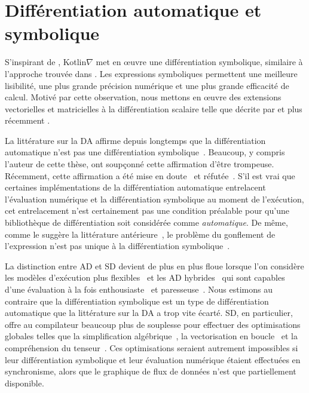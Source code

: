 \section{Différentiation automatique et symbolique}\label{sec:ad_vs_sd}

S'inspirant de \citet{mccarthy1960recursive}, Kotlin$\nabla$ met en œuvre une différentiation symbolique, similaire à l'approche trouvée dans \citet[\S 2.56--2.58]{abelson1996structure}. Les expressions symboliques permettent une meilleure lisibilité, une plus grande précision numérique et une plus grande efficacité de calcul. Motivé par cette observation, nous mettons en œuvre des extensions vectorielles et matricielles à la différentiation scalaire telle que décrite par \citet{dwyer1948symbolic} et plus récemment \citet{laue2018computing}.

La littérature sur la DA affirme depuis longtemps que la différentiation automatique n'est pas une différentiation symbolique~\citep{baydin2015survey}. Beaucoup, y compris l'auteur de cette thèse, ont soupçonné cette affirmation d'être trompeuse. Récemment, cette affirmation a été mise en doute~\citep{wang2018demystifying} et réfutée~\citep{laue2019equivalence}. S'il est vrai que certaines implémentations de la différentiation automatique entrelacent l'évaluation numérique et la différentiation symbolique au moment de l'exécution, cet entrelacement n'est certainement pas une condition préalable pour qu'une bibliothèque de différentiation soit considérée comme \textit{automatique}. De même, comme le suggère la littérature antérieure~\citep{baydin2014ad}, le problème du gonflement de l'expression n'est pas unique à la différentiation symbolique~\citep{laue2019equivalence}.

La distinction entre AD et SD devient de plus en plus floue lorsque l'on considère les modèles d'exécution plus flexibles~\citep{wang2018demystifying} et les AD hybrides~\citep{abadi2016tensorflow} qui sont capables d'une évaluation à la fois enthousiaste~\citep{paszke2019pytorch, agrawal2019tensorflow} et paresseuse~\citep{neubig2017dynet, van2018tangent}. Nous estimons au contraire que la différentiation symbolique est un type de différentiation automatique que la littérature sur la DA a trop vite écarté. SD, en particulier, offre au compilateur beaucoup plus de souplesse pour effectuer des optimisations globales telles que la simplification algébrique~\citep{bergstra2010theano}, la vectorisation en boucle~\citep{agarwal2019static} et la compréhension du tenseur~\citep{vasilache2018tensor, laue2020simple}. Ces optimisations seraient autrement impossibles si leur différentiation symbolique et leur évaluation numérique étaient effectuées en synchronisme, alors que le graphique de flux de données n'est que partiellement disponible.

